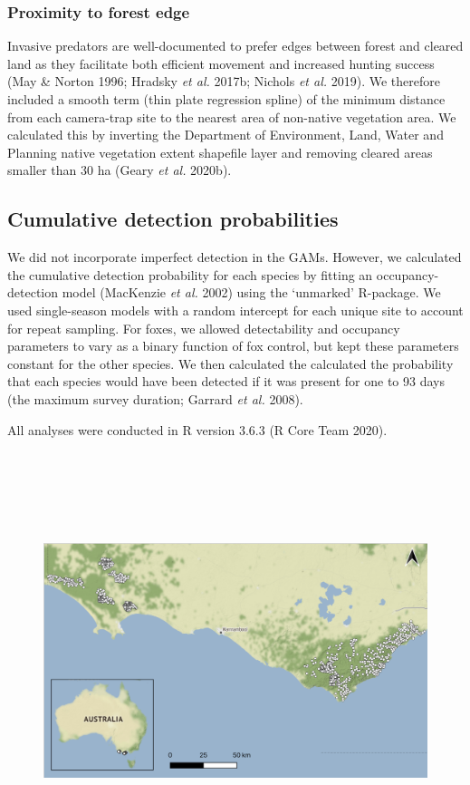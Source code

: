\documentclass[11pt,a4paper,titlepage,twoside,openright]{style/unimelbthesis}
\begin{document}
\begin{mainmatter}
\hypertarget{proximity-to-forest-edge}{%
\subsubsection{Proximity to forest edge}\label{proximity-to-forest-edge}}

Invasive predators are well-documented to prefer edges between forest and cleared land as they facilitate both efficient movement and increased hunting success (May \& Norton 1996; Hradsky \emph{et al.} 2017b; Nichols \emph{et al.} 2019). We therefore included a smooth term (thin plate regression spline) of the minimum distance from each camera-trap site to the nearest area of non-native vegetation area. We calculated this by inverting the Department of Environment, Land, Water and Planning native vegetation extent shapefile layer and removing cleared areas smaller than 30 ha (Geary \emph{et al.} 2020b).

\hypertarget{cumulative-detection-probabilities}{%
\subsection{Cumulative detection probabilities}\label{cumulative-detection-probabilities}}

We did not incorporate imperfect detection in the GAMs. However, we calculated the cumulative detection probability for each species by fitting an occupancy-detection model (MacKenzie \emph{et al.} 2002) using the `unmarked' R-package. We used single-season models with a random intercept for each unique site to account for repeat sampling. For foxes, we allowed detectability and occupancy parameters to vary as a binary function of fox control, but kept these parameters constant for the other species. We then calculated the calculated the probability that each species would have been detected if it was present for one to 93 days (the maximum survey duration; Garrard \emph{et al.} 2008).

All analyses were conducted in R version 3.6.3 (R Core Team 2020).

\newpage

\(~\)

\(~\)

\(~\)
\begin{figure}

{\centering \includegraphics[width=1\linewidth]{figure/map_cams} 

}
\end{figure}
\end{mainmatter}
\end{document}
